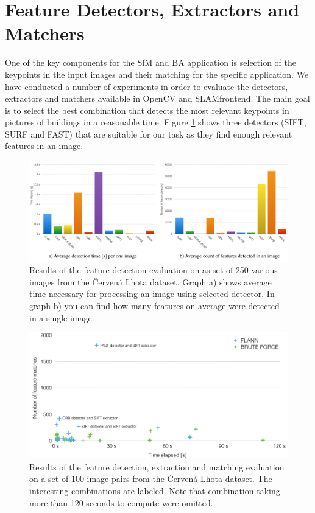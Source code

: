 \section{Feature Detectors, Extractors and Matchers}
\label{sec:experiments-extractors}
One of the key components for the SfM and BA application is selection of the keypoints in the input images and their matching for the specific application. We have conducted a number of experiments in order to evaluate the detectors, extractors and matchers available in OpenCV and SLAM\textunderscore frontend. The main goal is to select the best combination that detects the most relevant keypoints in pictures of buildings in a reasonable time. Figure \ref{fig:detectors} shows three detectors (SIFT, SURF and FAST) that are suitable for our task as they find enough relevant features in an image. 

\begin{figure}[!htbp]
	\begin{center}
		\includegraphics[keepaspectratio,width=\textwidth]{fig/detectors.pdf}
	\end{center}
	\caption{Results of the feature detection evaluation on as set of 250 various images from the Červená Lhota dataset. Graph a) shows average time necessary for processing an image using selected detector. In graph b) you can find how many features on average were detected in a single image.}
	\label{fig:detectors}
\end{figure}

\begin{figure}[!htbp]
	\begin{center}
		\includegraphics[keepaspectratio,width=\textwidth]{fig/matchers.pdf}
	\end{center}
	\caption{Results of the feature detection, extraction and matching evaluation on a set of 100 image pairs from the Červená Lhota dataset. The interesting combinations are labeled. Note that combination taking more than 120 seconds to compute were omitted.}
	\label{fig:matchers}
\end{figure}

